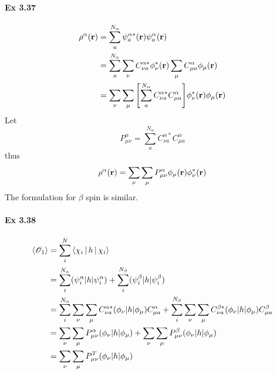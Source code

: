 \documentclass[a4paper]{article}
\newcommand{\ex}[1]{\paragraph{Ex #1}}
\numberwithin{equation}{subsection}
\begin{document}
\ex{3.37}
\begin{align}
\rho^\alpha(\vb{r}) &= \sum_a^{N_\alpha}  \psi_a^{\alpha*}(\vb{r})\psi_a^\alpha(\vb{r}) \notag\\
&=  \sum_a^{N_\alpha} \sum_\nu C^{\alpha*}_{\nu a}\phi_\nu^*(\vb{r}) 
\sum_\mu C_{\mu a}^\alpha\phi_\mu(\vb{r}) \notag\\
&= \sum_\nu\sum_\mu \qty[\sum_a^{N_\alpha} C^{\alpha*}_{\nu a}C_{\mu a}^\alpha ] \phi_\nu^*(\vb{r})\phi_\mu(\vb{r}) \notag\\
\end{align}
Let
\begin{equation}\label{key}
P^\alpha_{\mu\nu} = \sum_a^{N_\alpha} C^{\alpha*}_{\nu a}C_{\mu a}^\alpha 
\end{equation}
thus
\begin{equation}\label{key}
\rho^\alpha(\vb{r}) = \sum_\nu\sum_\mu P^\alpha_{\mu\nu} \phi_\mu(\vb{r}) \phi_\nu^*(\vb{r})
\end{equation}
The formulation for $ \beta $ spin is similar.

\ex{3.38}
\begin{align}
\ev{\mathscr{O}_1} &= \sum_i^N \Braket{\chi_i | h | \chi_i} \notag\\
&= \sum_i^{N_\alpha} (\psi_i^\alpha | h | \psi_i^\alpha) + \sum_i^{N_\beta} (\psi_i^\beta | h | \psi_i^\beta) \notag\\
&= \sum_i^{N_\alpha} \sum_\nu\sum_\mu C_{\nu a}^{\alpha*} (\phi_\nu | h | \phi_\mu) C_{\mu a}^\alpha 
+ \sum_i^{N_\beta} \sum_\nu\sum_\mu C_{\nu a}^{\beta*} (\phi_\nu | h | \phi_\mu) C_{\mu a}^\beta \notag\\
&= \sum_\nu\sum_\mu P_{\mu\nu}^\alpha (\phi_\nu | h | \phi_\mu) 
+ \sum_\nu\sum_\mu P_{\mu\nu}^\beta (\phi_\nu | h | \phi_\mu)  \notag\\
&= \sum_\nu\sum_\mu P_{\mu\nu}^T (\phi_\nu | h | \phi_\mu) 
\end{align}
\end{document}
